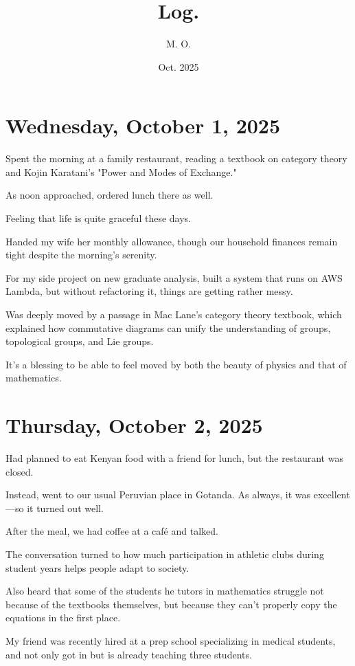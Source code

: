 \documentclass[uplatex]{jsarticle}
\title{
Log.
}
\author{
M. O.
}
\date{Oct. 2025}
\begin{document}
\maketitle

\section{Wednesday, October 1, 2025}

Spent the morning at a family restaurant, reading a textbook on category theory and Kojin Karatani's "Power and Modes of Exchange."

As noon approached, ordered lunch there as well.

Feeling that life is quite graceful these days.

Handed my wife her monthly allowance, though our household finances remain tight despite the morning's serenity.

For my side project on new graduate analysis, built a system that runs on AWS Lambda, but without refactoring it, things are getting rather messy.

Was deeply moved by a passage in Mac Lane's category theory textbook, which explained how commutative diagrams can unify the understanding of groups, topological groups, and Lie groups.

It's a blessing to be able to feel moved by both the beauty of physics and that of mathematics.



\section{Thursday, October 2, 2025}

Had planned to eat Kenyan food with a friend for lunch, but the restaurant was closed.

Instead, went to our usual Peruvian place in Gotanda. As always, it was excellent—so it turned out well.

After the meal, we had coffee at a café and talked.

The conversation turned to how much participation in athletic clubs during student years helps people adapt to society.

Also heard that some of the students he tutors in mathematics struggle not because of the textbooks themselves, but because they can't properly copy the equations in the first place.

My friend was recently hired at a prep school specializing in medical students, and not only got in but is already teaching three students.
\end{document}
